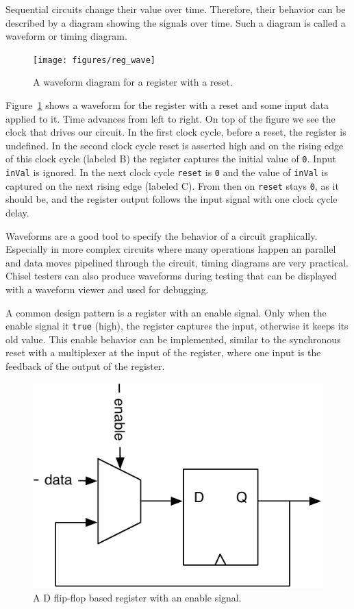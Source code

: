 \documentclass[%
    10pt,
    headinclude, footexclude,
    openright, %
    notitlepage,
    cleardoubleempty,
    headsepline,
    pointlessnumbers,
    bibtotoc, idxtotoc,
    ]{scrbook}
\newcommand{\code}[1]{{\small{\texttt{#1}}}}
\newcommand{\scale}{0.7}
\begin{document}
Sequential circuits change their value over time. Therefore, their behavior can be described
by a diagram showing the signals over time. Such a diagram is called a waveform or timing diagram.

\begin{figure}
  \centering
  \texttt{[image: figures/reg\_wave]}
  \caption{A waveform diagram for a register with a reset.}
  \label{fig:register-wave}
\end{figure}

Figure~\ref{fig:register-wave} shows a waveform for the register with a reset
and some input data applied to it.
Time advances from left to right. On top of the figure we see the clock that drives our circuit.
In the first clock cycle, before a reset, the register is undefined. In the second clock cycle reset
is asserted high and on the rising edge of this clock cycle (labeled B) the register
captures the initial value of \code{0}. Input \code{inVal} is ignored. In the next clock cycle
\code{reset} is \code{0} and the value of \code{inVal} is captured on the next rising
edge (labeled C). From then on \code{reset} stays \code{0}, as it should be, and the
register output follows the input signal with one clock cycle delay.

Waveforms are a good tool to specify the behavior of a circuit graphically.
Especially in more complex circuits where many operations happen an parallel
and data moves pipelined through the circuit, timing diagrams are very practical.
Chisel testers can also produce waveforms during testing that can be displayed
with a waveform viewer and used for debugging.

A common design pattern is a register with an enable signal. Only when the enable signal
it \code{true} (high), the register captures the input, otherwise it keeps its old value.
This enable behavior can be implemented, similar to the synchronous reset with
a multiplexer at the input of the register, where one input is the feedback of the
output of the register.

\begin{figure}
  \centering
  \includegraphics[scale=\scale]{figures/register-enable}
  \caption{A D flip-flop based register with an enable signal.}
  \label{fig:register-enable}
\end{figure}
\end{document}
